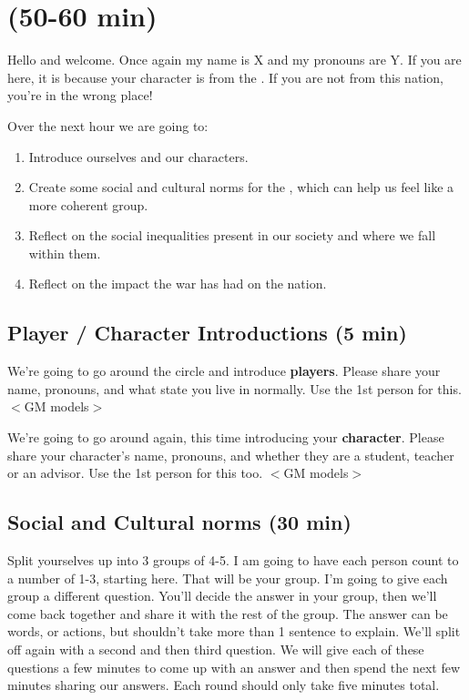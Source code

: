 \documentclass[green]{GL2020}
\begin{document}
\name{\gPreGameWR{}}

\section*{(50-60 min)}

Hello and welcome. Once again my name is X and my pronouns are Y. If you are here, it is because your character is from the \pShip{}. If you are not from this nation, you're in the wrong place!

Over the next hour we are going to:
\begin{enumerate}
	\item Introduce ourselves and our characters.
	\item Create some social and cultural norms for the \pShip{}, which can help us feel like a more coherent group.
	\item Reflect on the social inequalities present in our society and where we fall within them.
	\item Reflect on the impact the war has had on the nation.
\end{enumerate}

\subsection*{Player / Character Introductions (5 min)}
We’re going to go around the circle and introduce \textbf{players}. Please share your name, pronouns, and what state you live in normally. Use the 1st person for this. $<$GM models$>$

We’re going to go around again, this time introducing your \textbf{character}. Please share your character’s name, pronouns, and whether they are a student, teacher or an advisor. Use the 1st person for this too. $<$GM models$>$


\subsection*{Social and Cultural norms (30 min)}
Split yourselves up into 3 groups of 4-5. I am going to have each person count to a number of 1-3, starting here.  That will be your group.  I’m going to give each group a different question. You’ll decide the answer in your group, then we’ll come back together and share it with the rest of the group. The answer can be words, or actions, but shouldn't take more than 1 sentence to explain. We’ll split off again with a second and then third question.  We will give each of these questions a few minutes to come up with an answer and then spend the next few minutes sharing our answers.  Each round should only take five minutes total.
\end{document}
